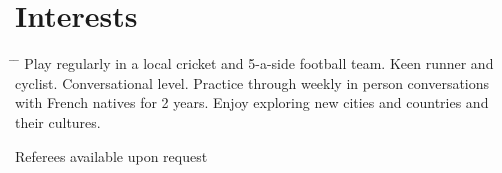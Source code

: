 \documentclass[10pt]{article} %
\begin{document}
\vspace{-5mm}
\section{Interests}

\begin{tabbing}
  \hspace{2mm} \= \hspace{18mm} \= \kill 
     {Play regularly in a local cricket and 5-a-side football team. Keen runner and cyclist.}
     {Conversational level. Practice through weekly in person conversations with French natives for 2 years.}
     {Enjoy exploring new cities and countries and their cultures.}
\end{tabbing}

\vspace{-4mm}
Referees available upon request
\end{document}
